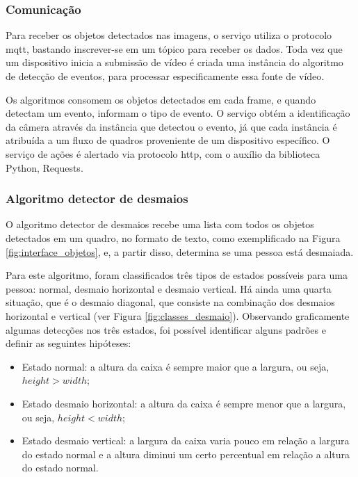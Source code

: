 \documentclass[]{politex}
\begin{document}
\subsubsection{Comunicação}
Para receber os objetos detectados nas imagens, o serviço utiliza o protocolo \acrshort{mqtt}, bastando inscrever-se em um tópico para receber os dados. Toda vez que um dispositivo inicia a submissão de vídeo é criada uma instância do algoritmo de detecção de eventos, para processar especificamente essa fonte de vídeo.

Os algoritmos consomem os objetos detectados em cada frame, e quando detectam um evento, informam o tipo de evento. O serviço obtém a identificação da câmera através da instância que detectou o evento, já que cada instância é atribuída a um fluxo de quadros proveniente de um dispositivo específico. O serviço de ações é alertado via protocolo \acrshort{http}, com o auxílio da biblioteca Python, Requests.

\subsubsection{Algoritmo detector de desmaios}\label{algoritmo_desmaio}
O algoritmo detector de desmaios recebe uma lista com todos os objetos detectados em um quadro, no formato de texto, como exemplificado na Figura \ref{fig:interface_objetos}, e, a partir disso, determina se uma pessoa está desmaiada.

Para este algoritmo, foram classificados três tipos de estados possíveis para uma pessoa: normal, desmaio horizontal e desmaio vertical. Há ainda uma quarta situação, que é o desmaio diagonal, que consiste na combinação dos desmaios horizontal e vertical (ver Figura \ref{fig:classes_desmaio}). Observando graficamente algumas detecções nos três estados, foi possível identificar alguns padrões e definir as seguintes hipóteses:

\begin{itemize}
    \item Estado normal: a altura da caixa é sempre maior que a largura, ou seja, \(height>width\);
    \item Estado desmaio horizontal: a altura da caixa é sempre menor que a largura, ou seja, \(height<width\);
    \item Estado desmaio vertical: a largura da caixa varia pouco em relação a largura do estado normal e a altura diminui um certo percentual em relação a altura do estado normal.
\end{itemize}
\end{document}
